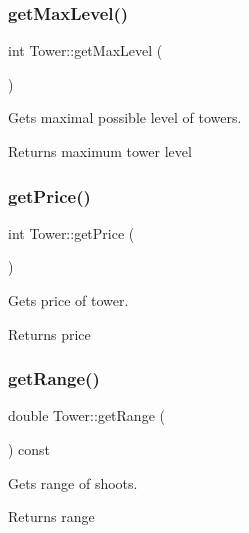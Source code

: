 \subsubsection{\texorpdfstring{get\+Max\+Level()}{getMaxLevel()}}
{\footnotesize\ttfamily int Tower\+::get\+Max\+Level (\begin{DoxyParamCaption}{ }\end{DoxyParamCaption})\hspace{0.3cm}{\ttfamily [static]}}



Gets maximal possible level of towers. 

\begin{DoxyReturn}{Returns}
maximum tower level 
\end{DoxyReturn}
\mbox{\label{class_tower_a3b495235e7ca4a76c858d62ba1775aac}} 
\subsubsection{\texorpdfstring{get\+Price()}{getPrice()}}
{\footnotesize\ttfamily int Tower\+::get\+Price (\begin{DoxyParamCaption}{ }\end{DoxyParamCaption})\hspace{0.3cm}{\ttfamily [static]}}



Gets price of tower. 

\begin{DoxyReturn}{Returns}
price 
\end{DoxyReturn}
\mbox{\label{class_tower_a703e8dff95cd8995db19479703dfc353}} 
\subsubsection{\texorpdfstring{get\+Range()}{getRange()}}
{\footnotesize\ttfamily double Tower\+::get\+Range (\begin{DoxyParamCaption}{ }\end{DoxyParamCaption}) const}



Gets range of shoots. 

\begin{DoxyReturn}{Returns}
range 
\end{DoxyReturn}
\mbox{\label{class_tower_a7712ef687630f1831073934629ddc984}} 
